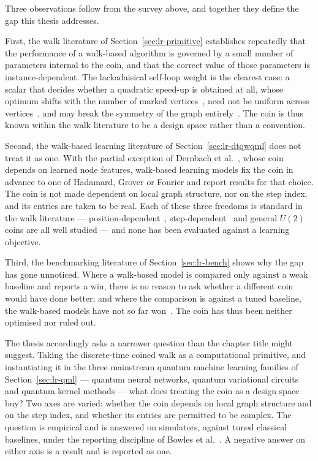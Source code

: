 Three observations follow from the survey above, and together they define the
gap this thesis addresses.

First, the walk literature of Section~\ref{sec:lr-primitive} establishes
repeatedly that the performance of a walk-based algorithm is governed by a small
number of parameters internal to the coin, and that the correct value of those
parameters is instance-dependent. The lackadaisical self-loop weight is the
clearest case: a scalar that decides whether a quadratic speed-up is obtained at
all, whose optimum shifts with the number of marked
vertices~\cite{Nahimovs_2018}, need not be uniform across
vertices~\cite{Rhodes_2019}, and may break the symmetry of the graph
entirely~\cite{Rapoza_2021}. The coin is thus known within the walk literature
to be a design space rather than a convention.

Second, the walk-based learning literature of Section~\ref{sec:lr-dtqwqml} does
not treat it as one. With the partial exception of Dernbach et
al.~\cite{Dernbach_2019}, whose coin depends on learned node features,
walk-based learning models fix the coin in advance to one of Hadamard, Grover or
Fourier and report results for that choice. The coin is not made dependent on
local graph structure, nor on the step index, and its entries are taken to be
real. Each of these three freedoms is standard in the walk literature ---
position-dependent~\cite{Ahmad_2020}, step-dependent~\cite{Panahiyan_2018} and
general $U(2)$~\cite{Li_2012, Souza_2013} coins are all well studied --- and
none has been evaluated against a learning objective.

Third, the benchmarking literature of Section~\ref{sec:lr-bench} shows why the
gap has gone unnoticed. Where a walk-based model is compared only against a
weak baseline and reports a win, there is no reason to ask whether a different
coin would have done better; and where the comparison is against a tuned
baseline, the walk-based models have not so far won~\cite{Bowles_2024}. The coin
has thus been neither optimised nor ruled out.

The thesis accordingly asks a narrower question than the chapter title might
suggest. Taking the discrete-time coined walk as a computational primitive, and
instantiating it in the three mainstream quantum machine learning families of
Section~\ref{sec:lr-qml} --- quantum neural networks, quantum variational
circuits and quantum kernel methods --- what does treating the coin as a design
space buy? Two axes are varied: whether the coin depends on local graph
structure and on the step index, and whether its entries are permitted to be
complex. The question is empirical and is answered on simulators, against tuned
classical baselines, under the reporting discipline of Bowles et
al.~\cite{Bowles_2024}. A negative answer on either axis is a result and is
reported as one.


